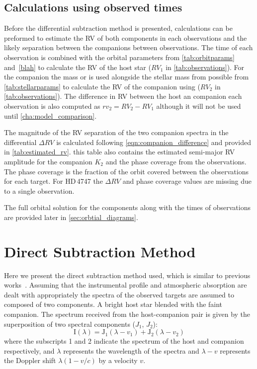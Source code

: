 \subsection{Calculations using observed times}
{\red{}
Before the differential subtraction method is presented, calculations can be preformed to estimate the RV of both components in each observations and the likely separation between the companions between observations.
The time of each observation is combined with the orbital parameters from \cref{tab:orbitparams} and~\ref{blah} to calculate the RV of the host star (\({RV}_{1}\) in \cref{tab:observations}).
For the companion the mass or \mtwosini  is used alongside the stellar mass from  possible from \cref{tab:stellarparams} to calculate the RV of the companion using  (\({RV}_{2}\) in \cref{tab:observations}).
The difference in RV between the host an companion each observation is also computed as \({rv}_{2} = {RV}_{2}-{RV}_{1}\) although it will not be used until \cref{cha:model_comparison}.

The magnitude of the RV separation of the two companion spectra in the differential \(\Delta RV\) is calculated following \cref{eqn:companion_difference} and provided in \cref{tab:estimated_rv}.
this table also contains the estimated semi-major RV amplitude for the companion \(K_2\) and the phase coverage from the observations.
The phase coverage is the fraction of the orbit covered between the observations for each target.
For {HD\,4747} the \(\Delta RV\) and phase coverage values are missing due to a single observation.
}



The full orbital solution for the components along with the times of observations are provided later in \cref{sec:orbtial_diagrams}.


\section{Direct Subtraction Method}
\label{sec:direct-subtraction}
Here we present the direct subtraction method used, which is similar to previous works~\citep{ferluga_separating_1997,kostogryz_spectral_2013}.
Assuming that the instrumental profile and atmospheric absorption are dealt with appropriately the spectra of the observed targets are assumed to composed of two components.
A bright host star blended with the faint companion.
The spectrum received from the host-companion pair is given by the superposition of two spectral components (\(J_{1}\), \(J_{2}\)):
\begin{equation}
\textrm{I}(\lambda) = \textrm{J}_{1}(\lambda - v_{1}) + \textrm{J}_{2}(\lambda - v_{2})
\end{equation}
where the subscripts 1 and 2 indicate the spectrum of the host and companion respectively, and \(\lambda\) represents the wavelength of the spectra and \(\lambda-v\) represents the Doppler shift \(\lambda(1-v/c)\) by a velocity \(v\).

